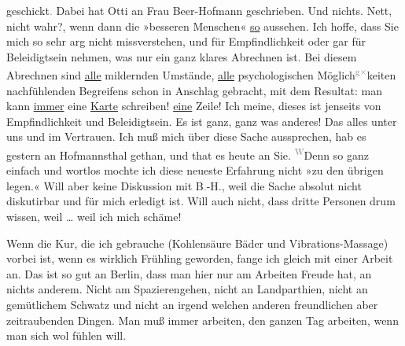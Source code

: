                   geschickt\textcolor{gray}{.} Dabei hat Otti an Frau Beer-Hofmann
               geschrieben. Und nichts. Nett, nicht wahr?, wenn dann die »besseren Menschen« \uline{so} aussehen. Ich hoffe, dass Sie mich so sehr arg
               nicht missverstehen, und für Empfindlichkeit oder gar für Beleidigtsein nehmen, was
               nur ein ganz klares Abrechnen ist. Bei diesem Abrechnen sind \uline{alle} mildernden Umstände, \uline{alle}
               psychologischen Möglich\substVorne{}\textsuperscript{\textcolor{gray}{g}\textcolor{gray}{×}}\substDazwischen{}k\substHinten{}eiten nachfühlenden Begreifens schon in Anschlag gebracht, mit dem Resultat:
               man kann \uline{immer} eine \uline{Karte} schreiben! \uline{eine} Zeile! Ich meine,
               dieses ist jenseits von Empfindlichkeit und Beleidigtsein. Es ist ganz, ganz was
               anderes! Das alles unter uns und im Vertrauen. Ich muß mich über diese Sache
               aussprechen, hab es gestern an Hofmannsthal gethan, und that es heute an Sie. \substVorne{}\textsuperscript{\textcolor{gray}{W}}\substDazwischen{}De\substHinten{}nn so ganz einfach und wortlos mochte ich diese neueste Erfahrung nicht »zu
               den übrigen legen.« Will aber keine Diskussion mit B\textcolor{gray}{.}-H., weil die Sache absolut nicht diskutirbar und
               für mich erledigt ist. Will auch nicht, dass dritte Personen drum wissen, weil {\dots} weil ich mich schäme!\pend
           
\pstart
           Wenn die Kur, die ich gebrauche (Kohlensäure Bäder und Vibrations-Massage) vorbei
               ist, wenn es wirklich Frühling geworden, fange ich gleich mit einer Arbeit an. Das
               ist so gut an Berlin, dass man hier nur am
               Arbeiten Freude hat, an nichts anderem. Nicht am Spazierengehen, nicht an
               Landparthien, nicht an gemütlichem Schwatz und nicht an irgend welchen anderen
               freundlichen aber zeitraubenden Dingen. Man muß immer arbeiten, den ganzen Tag
               arbeiten, wenn man sich wol fühlen will.\pend
           
